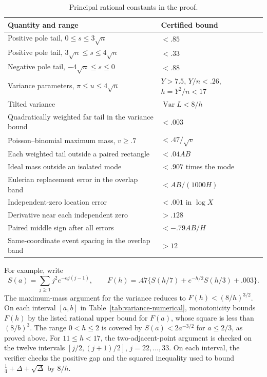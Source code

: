 \begin{table}[htbp]
\centering\small
\begin{tabular}{p{}p{}}
\toprule
Quantity and range & Certified bound \\
\midrule
Positive pole tail, $0\le s\le3\sqrt n$ & $<.85$ \\
Positive pole tail, $3\sqrt n\le s\le4\sqrt n$ & $<.33$ \\
Negative pole tail, $-4\sqrt n\le s\le0$ & $<.88$ \\
Variance parameters, $\pi\le u\le4\sqrt n$ &
 $Y>7.5$, $Y/n<.26$, $h=Y^2/n<17$ \\
Tilted variance & $\operatorname{Var}L<8/h$ \\
Quadratically weighted far tail in the variance bound & $<.003$ \\
Poisson--binomial maximum mass, $v\ge.7$ & $<.47/\sqrt v$ \\
Each weighted tail outside a paired rectangle & $<.04AB$ \\
Ideal mass outside an isolated mode & $<.907$ times the mode \\
Eulerian replacement error in the overlap band & $<AB/(1000H)$ \\
Independent-zero location error & $<.001$ in $\log X$ \\
Derivative near each independent zero & $>.128$ \\
Paired middle sign after all errors & $<-.79AB/H$ \\
Same-coordinate event spacing in the overlap band & $>12$ \\
\bottomrule
\end{tabular}
\caption{Principal rational constants in the proof.}
\label{tab:scalar-summary}
\end{table}

For example, write
\[
 S(a)=\sum_{j\ge1}j^2e^{-aj(j-1)},\qquad
 F(h)=.47\{S(h/7)+e^{-h/2}S(h/3)+.003\}.
\]
The maximum-mass argument for the variance reduces to
$F(h)<(8/h)^{3/2}$. On each interval $[a,b]$ in
Table~\ref{tab:variance-numerical}, monotonicity bounds $F(h)$ by the
listed rational upper bound for $F(a)$, whose square is less than
$(8/b)^3$. The range $0<h\le2$ is covered by
$S(a)<2a^{-3/2}$ for $a\le2/3$, as proved above.
For $11\le h<17$, the two-adjacent-point argument is checked on the
twelve intervals $[j/2,(j+1)/2]$, $j=22,\ldots,33$. On each interval,
the verifier checks the positive gap and the squared inequality used to
bound $\frac14+\Delta+\sqrt\Delta$ by $8/h$.

